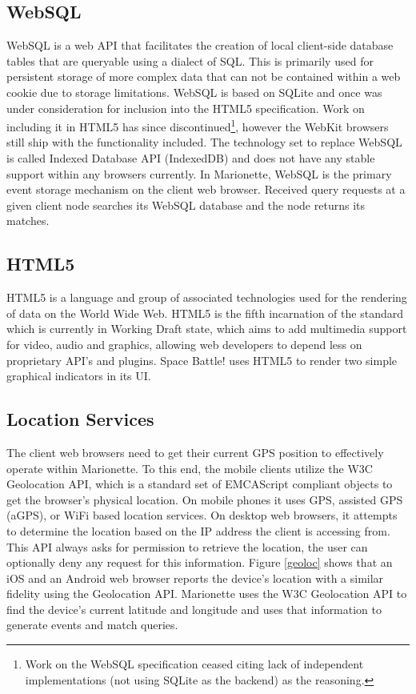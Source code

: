 \documentclass[12pt]{report}	%
\theoremstyle{definition}
\theoremstyle{remark}
\begin{document}
\subsection{WebSQL}

WebSQL is a web API that facilitates the creation of local client-side
database tables that are queryable using a dialect of SQL. This is
primarily used for persistent storage of more complex data that can not
be contained within a web cookie due to storage limitations. WebSQL is
based on SQLite and once was under consideration for inclusion into the
HTML5 specification. Work on including it in HTML5 has since
discontinued\footnote{Work on the WebSQL specification ceased citing lack 
of independent implementations (not using SQLite as the backend) as the reasoning.}, however the WebKit browsers still ship with the
functionality included. The technology set to replace WebSQL is called
Indexed Database API (IndexedDB) and does not have any stable support
within any browsers currently. In Marionette, WebSQL is the primary event storage
mechanism on the client web browser. Received query requests at a given client node 
searches its WebSQL database and the node returns its matches.

\subsection{HTML5}

HTML5 is a language and group of associated technologies used for the
rendering of data on the World Wide Web. HTML5 is the fifth incarnation
of the standard which is currently in Working Draft state, which aims to 
add multimedia support for video, audio and graphics, allowing web 
developers to depend less on proprietary API's and plugins. Space Battle!
uses HTML5 to render two simple graphical indicators in its UI.

\subsection{Location Services}

The client web browsers need to get their current GPS position to
effectively operate within Marionette. To this end, the mobile clients
utilize the W3C Geolocation API, which is a standard set of EMCAScript
compliant objects to get the browser's physical location. On mobile
phones it uses GPS, assisted GPS (aGPS), or WiFi based location
services. On desktop web browsers, it attempts to determine the location
based on the IP address the client is accessing from. This API always
asks for permission to retrieve the location, the user can optionally deny
any request for this information. Figure \ref{geoloc}
shows that an iOS and an Android web browser reports the device's
location with a similar fidelity using the Geolocation API. Marionette uses the W3C Geolocation API to find the device's current latitude and longitude and uses that information to generate events and match queries.
\end{document}
